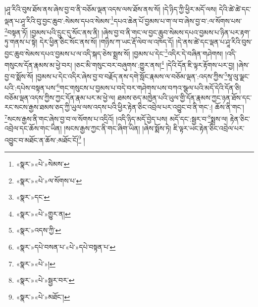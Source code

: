 །ཤཱ་རིའི་བུས་ཐོས་ནས་ཞེས་བྱ་བ་ནི་བཅོམ་ལྡན་འདས་ལས་ཐོས་ནས་སོ། །དེ་ཉིད་ཀྱི་ཕྱིར་མདོ་ལས། དེའི་ཚེ་ཚེ་དང་ལྡན་པ་ཤཱ་རིའི་བུ་བྱང་ཆུབ་:སེམས་དཔའ་སེམས་\footnote{«སྣར་»«པེ་»སེམས་}དཔའ་ཆེན་པོ་བྱམས་པ་ག་ལ་བ་ཞེས་བྱ་བ་:ལ་སོགས་པས་\footnote{«སྣར་»«པེ་»ལ་སོགས་པ་}བསྟན་ཏོ། །བྱམས་པའི་དྲུང་དུ་སོང་ནས་ནི། །ཞེས་བྱ་བ་ནི་གང་ལ་བྱང་ཆུབ་སེམས་དཔའ་བྱམས་པ་ཉིན་པར་རྟག་ཏུ་གནས་པ་སྟེ། དེར་ཕྱིན་ཅིང་སོང་ནས་སོ། །གཉིས་ཀ་ཡང་རྡོ་ལེབ་ལ་འཁོད་དོ། །དེ་ནས་ཚེ་དང་ལྡན་པ་ཤཱ་རིའི་བུས་བྱང་ཆུབ་སེམས་དཔའ་བྱམས་པ་ལ་འདི་སྐད་ཅེས་སྨྲས་སོ། །བྱམས་པ་དེང་\footnote{«སྣར་»དང་}འདིར་དེ་བཞིན་གཤེགས། །འདི་གསུངས་དོན་རྣམས་མ་ཕྱེ་བར། །ཅང་མི་གསུང་བར་བཞུགས་:གྱུར་ནས།\footnote{«སྣར་»«པེ་»གྱུར་ན།} །དེའི་དོན་ཇི་ལྟར་རྟོགས་པར་བྱ། །ཞེས་བྱ་བ་སྨོས་སོ། །བྱམས་པ་དེང་འདིར་ཞེས་བྱ་བ་བརྗོད་ནས་དགེ་སློང་རྣམས་ལ་བཅོམ་ལྡན་:འདས་ཀྱིས་\footnote{«སྣར་»འདས་ཀྱི་}སཱ་ལུ་ལྗང་པའི་:དཔེས་བསྟན་པས་\footnote{«སྣར་»དཔེ་བསན་པ་«པེ་»དཔེ་བསྟན་པ་}གང་གསུངས་པ་བྱམས་པ་བདེ་བར་གཤེགས་པས་བཀའ་སྩལ་པའི་མདོ་དེའི་དོན་ཅི། བཅོམ་ལྡན་འདས་ཀྱིས་ཀྱང་དོན་རྣམ་པར་མ་ཕྱེ་ལ། ཐམས་ཅད་མཁྱེན་པའི་ཡུལ་གྱི་དོན་རྣམས་ཀྱང་ཉན་ཐོས་དང་རང་སངས་རྒྱས་ཐམས་ཅད་ཀྱི་ཡུལ་ལས་འདས་པའི་ཕྱིར་རྟེན་ཅིང་འབྲེལ་པར་འབྱུང་བ་ནི་གང་:། ཆོས་ནི་གང་། \footnote{«སྣར་»«པེ་»།  }སངས་རྒྱས་ནི་གང་ཞེས་བྱ་བ་ལ་སོགས་པ་འདྲིའོ། །འདི་ཉིད་མདོ་བྱེད་པས། མདོ་དང་:སྦྱར་བ་\footnote{«སྣར་»«པེ་»སྦྱར་བར་}སྨྲས་ལ། རྟེན་ཅིང་འབྲེལ་དང་ཆོས་གང་ཡིན། །སངས་རྒྱས་ཀྱང་ནི་གང་ཞིག་ཡིན། །ཞེས་སྨོས་ཏེ། ཇི་ལྟར་ཡང་རྟེན་ཅིང་འབྲེལ་པར་འབྱུང་བ་མཐོང་ན་ཆོས་:མཐོང་ངོ།\footnote{«སྣར་»«པེ་»མཐོང་།} །
